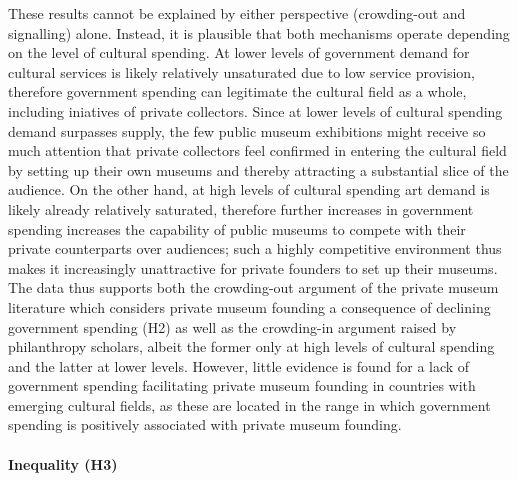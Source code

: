 \documentclass[11pt]{article}
\begin{document}
These results cannot be explained by either perspective (crowding-out and signalling) alone. 
Instead, it is plausible that both mechanisms operate depending on the level of cultural spending.
At lower levels of government demand for cultural services is likely relatively unsaturated due to low service provision, therefore government spending can legitimate the cultural field as a whole, including iniatives of private collectors.
Since at lower levels of cultural spending demand surpasses supply, the few public museum exhibitions might receive so much attention that private collectors feel confirmed in entering the cultural field by setting up their own museums and thereby attracting a substantial slice of the audience.
On the other hand, at high levels of cultural spending art demand is likely already relatively saturated, therefore further increases in government spending increases the capability of public museums to compete with their private counterparts over audiences; such a highly competitive environment thus makes it increasingly unattractive for private founders to set up their museums. 
The data thus supports both the crowding-out argument of the private museum literature which considers private museum founding a consequence of declining government spending (H2) as well as the crowding-in argument raised by philanthropy scholars, albeit the former only at high levels of cultural spending and the latter at lower levels.
However, little evidence is found for a lack of government spending facilitating private museum founding in countries with emerging cultural fields, as these are located in the range in which government spending is positively associated with private museum founding. 

\paragraph*{Inequality (H3)}
\end{document}

